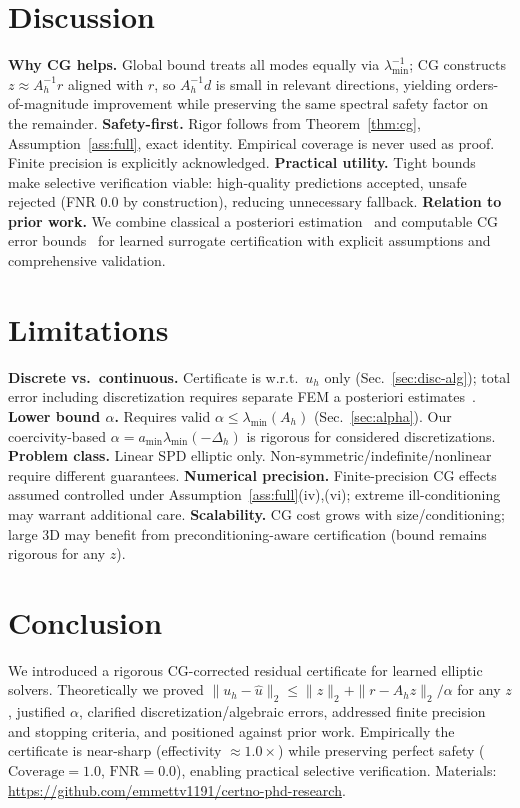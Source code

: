 \documentclass[conference]{IEEEtran}
\theoremstyle{plain}
\theoremstyle{definition}
\begin{document}
\section{Discussion}
\label{sec:discussion}
\textbf{Why CG helps.} Global bound treats all modes equally via $\lambda_{\min}^{-1}$; CG constructs $z\approx A_h^{-1}r$ aligned with $r$, so $A_h^{-1}d$ is small in relevant directions, yielding orders-of-magnitude improvement while preserving the same spectral safety factor on the remainder.
\textbf{Safety-first.} Rigor follows from Theorem~\ref{thm:cg}, Assumption~\ref{ass:full}, exact identity. Empirical coverage is never used as proof. Finite precision is explicitly acknowledged.
\textbf{Practical utility.} Tight bounds make selective verification viable: high-quality predictions accepted, unsafe rejected (FNR 0.0 by construction), reducing unnecessary fallback.
\textbf{Relation to prior work.} We combine classical a posteriori estimation~\cite{ainsworth2000posteriori,verfurth2013posteriori} and computable CG error bounds~\cite{meurant1999computable,jiranek2010posteriori,meurant2013accuracy,strakos2005error} for learned surrogate certification with explicit assumptions and comprehensive validation.

\section{Limitations}
\label{sec:limits}
\textbf{Discrete vs.\ continuous.} Certificate is w.r.t.\ $u_h$ only (Sec.~\ref{sec:disc-alg}); total error including discretization requires separate FEM a posteriori estimates~\cite{ainsworth2000posteriori,verfurth2013posteriori}.
\textbf{Lower bound $\alpha$.} Requires valid $\alpha \le \lambda_{\min}(A_h)$ (Sec.~\ref{sec:alpha}). Our coercivity-based $\alpha=a_{\min}\lambda_{\min}(-\Delta_h)$ is rigorous for considered discretizations.
\textbf{Problem class.} Linear SPD elliptic only. Non-symmetric/indefinite/nonlinear require different guarantees.
\textbf{Numerical precision.} Finite-precision CG effects~\cite{greenbaum1989behavior,strakos2005error} assumed controlled under Assumption~\ref{ass:full}(iv),(vi); extreme ill-conditioning may warrant additional care.
\textbf{Scalability.} CG cost grows with size/conditioning; large 3D may benefit from preconditioning-aware certification (bound remains rigorous for any $z$).

\section{Conclusion}
\label{sec:conclusion}
We introduced a rigorous CG-corrected residual certificate for learned elliptic solvers. Theoretically we proved $\|u_h-\hat{u}\|_2 \le \|z\|_2 + \|r-A_h z\|_2/\alpha$ for any $z$, justified $\alpha$, clarified discretization/algebraic errors, addressed finite precision and stopping criteria, and positioned against prior work. Empirically the certificate is near-sharp (effectivity $\approx 1.0\times$) while preserving perfect safety ($\text{Coverage}=1.0$, $\text{FNR}=0.0$), enabling practical selective verification. Materials: \url{https://github.com/emmettv1191/certno-phd-research}.
\end{document}
